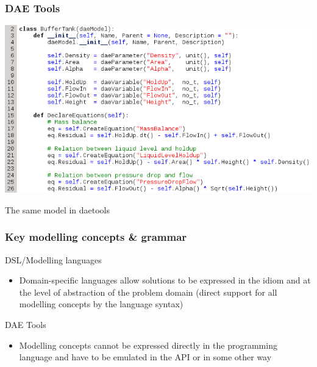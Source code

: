 \documentclass{beamer}
\begin{document}
\begin{frame}
\frametitle{DAE Tools}
  \begin{center}
    \includegraphics[width=0.85\paperwidth]{../_static/daetools_model.png}
  \end{center}
  \begin{center}
    {\small The same model in daetools}
  \end{center}
\end{frame}

\begin{frame}
\frametitle{Key modelling concepts \& grammar}
\begin{block}{\textcolor{light_green}{DSL/Modelling languages}}
\begin{itemize}
  \item Domain-specific languages allow solutions to be expressed in the idiom and at the level of abstraction of the problem domain 
        (direct support for all modelling concepts by the language syntax)
\end{itemize}
\end{block}

\begin{block}{\textcolor{light_red}{DAE Tools}}
\begin{itemize}
  \item Modelling concepts cannot be expressed directly in the programming language and have to be emulated in the API or in 
        some other way
\end{itemize}
\end{block}
\end{frame}
\end{document}
